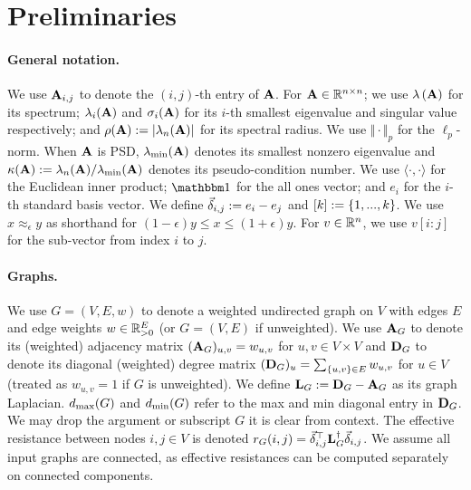 
\section{Preliminaries}
\label{section:preliminaries}\label{sec:preliminaries}

\paragraph{General notation.}{ We use $\mathbf{A}_{i,j}$ to denote the $(i,j)$-th entry of $\mathbf{A}$. For $\mathbf{A} \in \mathbb{R}^{n\times n}$; we use $\lambda\left(\mathbf{A}\right)$ for its spectrum; $\lambda_i(\mathbf{A})$ and $\sigma_i(\mathbf{A})$ for its $i$-th smallest eigenvalue and singular value respectively; and $\rho(\mathbf{A}) := \left| \lambda_n(\mathbf{A}) \right|$ for its spectral radius. We use $\Vert \cdot\Vert_p$ for the $\ell_p$-norm. When $\mathbf{A}$ is PSD, $\lambda_{\mathrm{min}}(\mathbf{A})$ denotes its smallest nonzero eigenvalue and $\kappa(\mathbf{A}):=\lambda_n(\mathbf{A})/\lambda_{\mathrm{min}}(\mathbf{A})$ denotes its pseudo-condition number. We use $\langle \cdot, \cdot \rangle$ for the Euclidean inner product; $\one$ for the all ones vector; and $e_i$ for the $i$-th standard basis vector. We define $\vec{\delta}_{i,j} := e_i - e_j$ and $[k] := \{1, ..., k\}$. We use $x \approx_\epsilon y$ as shorthand for $(1-\epsilon) y \leq x \leq (1+\epsilon) y$. For $v \in \mathbb{R}^n$, we use $v[i:j]$ for the sub-vector from index $i$ to $j$.}

\paragraph{Graphs.}{We use $G = (V, E, w)$ to denote a weighted undirected graph on $V$ with edges $E$ and edge weights $w \in \mathbb{R}^{E}_{> 0}$ (or $G = (V, E)$ if unweighted). We use $\mathbf{A}_G$ to denote its (weighted) adjacency matrix $(\mathbf{A}_G)_{u,v} = w_{u,v}$ for $u,v \in V \times V$ and $\mathbf{D}_G$ to denote its diagonal (weighted) degree matrix $(\mathbf{D}_G)_{u} = \sum_{\{u, v\} \in E} w_{u,v}$ for $u \in V$ (treated as $w_{u,v} = 1$ if $G$ is unweighted). We define $\mathbf{L}_{G} := \mathbf{D}_G - \mathbf{A}_G$ as its graph Laplacian. $d_{\max}(G)$ and ${d_{\min}}(G)$ refer to the max and min diagonal entry in $\mathbf{D}_G$. We may drop the argument or subscript $G$ it is clear from context. The effective resistance between nodes $i, j \in V$ is denoted ${r}_G({i,j}) = \vec{\delta}_{i,j}^\top \mathbf{L}_{G}^\dagger \vec{\delta}_{i,j}$. We assume all input graphs are connected, as effective resistances can be computed separately on connected components.
}

